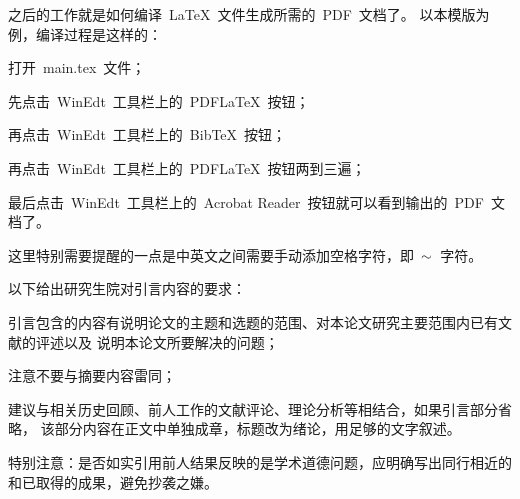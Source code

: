 之后的工作就是如何编译~\LaTeX~文件生成所需的~PDF~文档了。
以本模版为例，编译过程是这样的：
\begin{asparaenum}
    \item 打开~main.tex~文件；
    \item 先点击~WinEdt~工具栏上的~PDF\LaTeX{}~按钮；
    \item 再点击~WinEdt~工具栏上的~Bib\TeX{}~按钮；
    \item 再点击~WinEdt~工具栏上的~PDF\LaTeX{}~按钮两到三遍；
    \item 最后点击~WinEdt~工具栏上的~Acrobat Reader~按钮就可以看到输出的~PDF~文档了。
\end{asparaenum}

\textcolor[rgb]{1.00,0.00,0.00}{这里特别需要提醒的一点是中英文之间需要手动添加空格字符，即~$\scriptsize{\sim}$~字符。}


以下给出研究生院对引言内容的要求：
\begin{asparaenum}
    \item 引言包含的内容有说明论文的主题和选题的范围、对本论文研究主要范围内已有文献的评述以及
        说明本论文所要解决的问题；
    \item 注意不要与摘要内容雷同；
    \item 建议与相关历史回顾、前人工作的文献评论、理论分析等相结合，如果引言部分省略，
        该部分内容在正文中单独成章，标题改为绪论，用足够的文字叙述。
\end{asparaenum}

\textcolor[rgb]{1.00,0.00,0.00}
{特别注意：是否如实引用前人结果反映的是学术道德问题，应明确写出同行相近的和已取得的成果，避免抄袭之嫌。}



